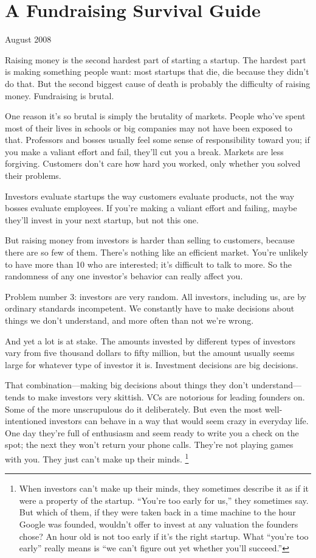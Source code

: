 \chapter{A Fundraising Survival Guide}

August 2008

Raising money is the second hardest part of starting a startup. The
hardest part is making something people want: most startups that die,
die because they didn't do that. But the second biggest cause of death
is probably the difficulty of raising money. Fundraising is brutal.

One reason it's so brutal is simply the brutality of markets. People
who've spent most of their lives in schools or big companies may not
have been exposed to that. Professors and bosses usually feel some sense
of responsibility toward you; if you make a valiant effort and fail,
they'll cut you a break. Markets are less forgiving. Customers don't
care how hard you worked, only whether you solved their problems.

Investors evaluate startups the way customers evaluate products, not the
way bosses evaluate employees. If you're making a valiant effort and
failing, maybe they'll invest in your next startup, but not this one.

But raising money from investors is harder than selling to customers,
because there are so few of them. There's nothing like an efficient
market. You're unlikely to have more than 10 who are interested; it's
difficult to talk to more. So the randomness of any one investor's
behavior can really affect you.

Problem number 3: investors are very random. All investors, including
us, are by ordinary standards incompetent. We constantly have to make
decisions about things we don't understand, and more often than not
we're wrong.

And yet a lot is at stake. The amounts invested by different types of
investors vary from five thousand dollars to fifty million, but the
amount usually seems large for whatever type of investor it is.
Investment decisions are big decisions.

That combination---making big decisions about things they don't
understand---tends to make investors very skittish. VCs are notorious
for leading founders on. Some of the more unscrupulous do it
deliberately. But even the most well-intentioned investors can behave in
a way that would seem crazy in everyday life. One day they're full of
enthusiasm and seem ready to write you a check on the spot; the next
they won't return your phone calls. They're not playing games with you.
They just can't make up their minds. \footnote{When investors can't make up their minds, they sometimes
describe it as if it were a property of the startup. ``You're too early
for us,'' they sometimes say. But which of them, if they were taken back
in a time machine to the hour Google was founded, wouldn't offer to
invest at any valuation the founders chose? An hour old is not too early
if it's the right startup. What ``you're too early'' really means is
``we can't figure out yet whether you'll succeed.''}

